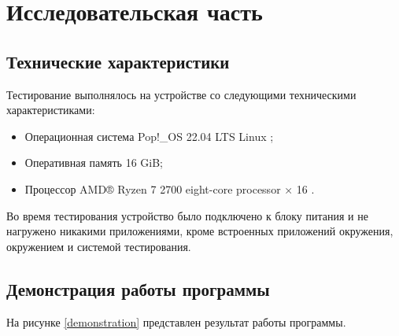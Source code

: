 \chapter{Исследовательская часть}
\section{Технические характеристики}
Тестирование выполнялось на устройстве со следующими техническими характеристиками:
\begin{itemize}
	\item Операционная система Pop!\_OS 22.04 LTS \cite{ubuntu} Linux \cite{linux};
	\item Оперативная память 16 GiB;
	\item Процессор AMD® Ryzen 7 2700 eight-core processor × 16 \cite{amd}.
\end{itemize}
Во время тестирования устройство было подключено к блоку питания и не нагружено никакими приложениями, кроме встроенных приложений окружения, окружением и системой тестирования.

\section{Демонстрация работы программы}



На рисунке \ref{demonstration} представлен результат работы программы.

